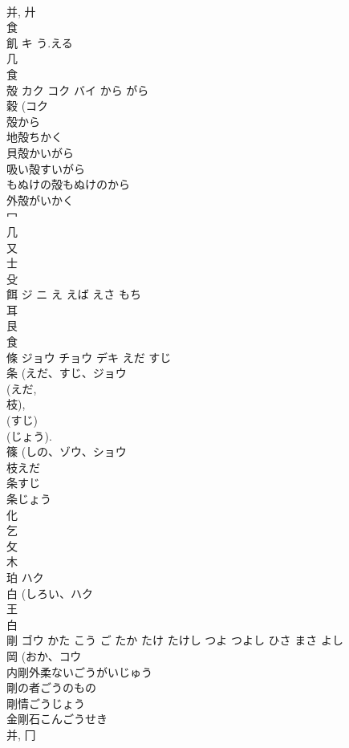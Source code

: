 \documentclass[8pt]{extreport}
\begin{document}
\begin{CJK}{UTF8}{min}
\\	并, 廾 
\\	食 
\\	飢	キ	う.える	
\\	几 
\\	食 
\\	殻	カク コク バイ	から がら	
\\	穀 (コク 
\\	殻から 
\\	地殻ちかく 
\\	貝殻かいがら 
\\	吸い殻すいがら 
\\	もぬけの殻もぬけのから 
\\	外殻がいかく 
\\	冖 
\\	几 
\\	又 
\\	士 
\\	殳 
\\	餌	ジ ニ	え えば えさ もち	
\\	耳 
\\	艮 
\\	食 
\\	條	ジョウ チョウ デキ	えだ すじ	
\\	条 (えだ、すじ、ジョウ 
\\	(えだ, 
\\	枝), 
\\	(すじ) 
\\	(じょう). 
\\	篠 (しの、ゾウ、ショウ 
\\	枝えだ 
\\	条すじ 
\\	条じょう 
\\	化 
\\	乞 
\\	攵 
\\	木 
\\	珀	ハク		
\\	白 (しろい、ハク 
\\	王 
\\	白 
\\	剛	ゴウ	かた こう ご たか たけ たけし つよ つよし ひさ まさ よし	
\\	岡 (おか、コウ 
\\	内剛外柔ないごうがいじゅう
\\	剛の者ごうのもの
\\	剛情ごうじょう
\\	金剛石こんごうせき
\\	并, 冂 

\end{CJK}
\end{document}

